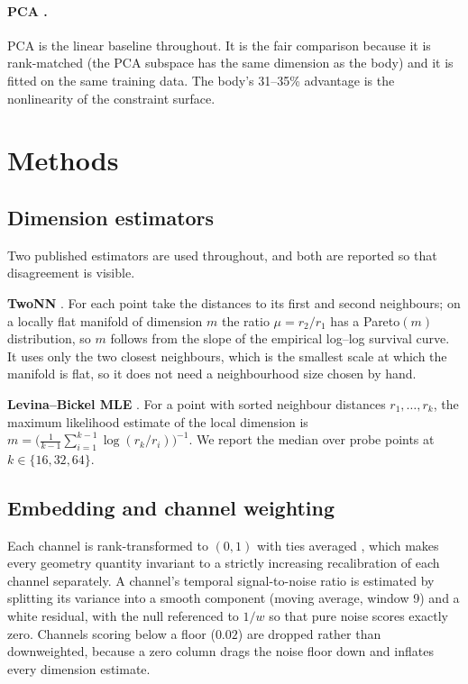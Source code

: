 \documentclass[11pt]{article}
\begin{document}
\paragraph{PCA \cite{pearson1901,jolliffe2002}.} PCA is the linear baseline
throughout. It is the fair comparison because it is rank-matched (the PCA
subspace has the same dimension as the body) and it is fitted on the same
training data. The body's 31--35\% advantage is the nonlinearity of the
constraint surface.

\section{Methods}

\subsection{Dimension estimators}

Two published estimators are used throughout, and both are reported so that
disagreement is visible.

\textbf{TwoNN} \cite{facco2017}. For each point take the distances to its
first and second neighbours; on a locally flat manifold of dimension $m$ the
ratio $\mu = r_2/r_1$ has a Pareto$(m)$ distribution, so $m$ follows from the
slope of the empirical log--log survival curve. It uses only the two closest
neighbours, which is the smallest scale at which the manifold is flat, so it
does not need a neighbourhood size chosen by hand.

\textbf{Levina--Bickel MLE} \cite{levina2004}. For a point with sorted
neighbour distances $r_1, \ldots, r_k$, the maximum likelihood estimate of the
local dimension is
$m = \big(\frac{1}{k-1}\sum_{i=1}^{k-1}\log(r_k/r_i)\big)^{-1}$.
We report the median over probe points at $k \in \{16, 32, 64\}$.

\subsection{Embedding and channel weighting}

Each channel is rank-transformed to $(0,1)$ with ties averaged
\cite{lehmann2006}, which makes every geometry quantity invariant to a
strictly increasing recalibration of each channel separately. A channel's
temporal signal-to-noise ratio is estimated by splitting its variance into a
smooth component (moving average, window 9) and a white residual, with the null
referenced to $1/w$ so that pure noise scores exactly zero. Channels scoring
below a floor ($0.02$) are dropped rather than downweighted, because a zero
column drags the noise floor down and inflates every dimension estimate.
\end{document}
